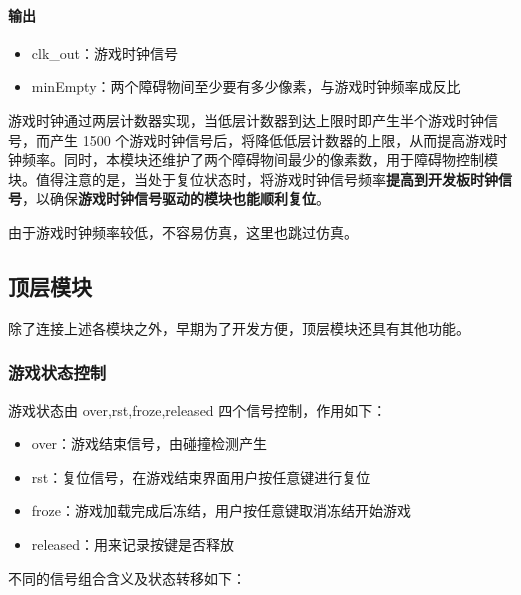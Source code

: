 \documentclass[hyperref,UTF8,12pt,a4paper]{ctexart}
\providecommand{\tightlist}{%
  \setlength{\itemsep}{0pt}\setlength{\parskip}{0pt}}
\begin{document}
\hypertarget{ux8f93ux51fa-8}{%
\paragraph{输出}\label{ux8f93ux51fa-8}}

\begin{itemize}
\tightlist
\item
  clk\_out：游戏时钟信号
\item
  minEmpty：两个障碍物间至少要有多少像素，与游戏时钟频率成反比
\end{itemize}

游戏时钟通过两层计数器实现，当低层计数器到达上限时即产生半个游戏时钟信号，而产生
1500
个游戏时钟信号后，将降低低层计数器的上限，从而提高游戏时钟频率。同时，本模块还维护了两个障碍物间最少的像素数，用于障碍物控制模块。值得注意的是，当处于复位状态时，将游戏时钟信号频率\textbf{提高到开发板时钟信号}，以确保\textbf{游戏时钟信号驱动的模块也能顺利复位}。

由于游戏时钟频率较低，不容易仿真，这里也跳过仿真。

\hypertarget{ux9876ux5c42ux6a21ux5757}{%
\subsection{顶层模块}\label{ux9876ux5c42ux6a21ux5757}}

除了连接上述各模块之外，早期为了开发方便，顶层模块还具有其他功能。

\hypertarget{ux6e38ux620fux72b6ux6001ux63a7ux5236}{%
\subsubsection{游戏状态控制}\label{ux6e38ux620fux72b6ux6001ux63a7ux5236}}

游戏状态由 over,rst,froze,released 四个信号控制，作用如下：

\begin{itemize}
\tightlist
\item
  over：游戏结束信号，由碰撞检测产生
\item
  rst：复位信号，在游戏结束界面用户按任意键进行复位
\item
  froze：游戏加载完成后冻结，用户按任意键取消冻结开始游戏
\item
  released：用来记录按键是否释放
\end{itemize}

不同的信号组合含义及状态转移如下：
\end{document}

